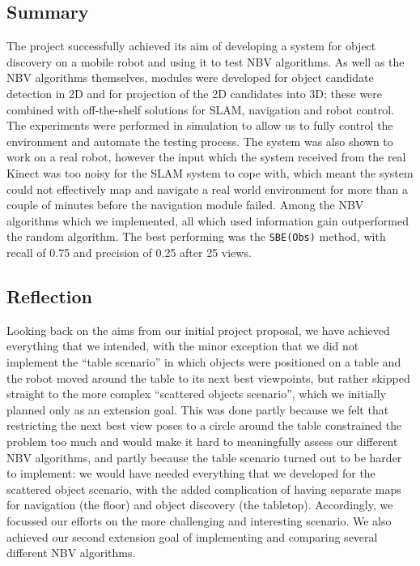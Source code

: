 

\subsection{Summary}

The project successfully achieved its aim of developing a system for object discovery on a mobile robot and using it to test NBV algorithms.
As well as the NBV algorithms themselves, modules were developed for object candidate detection in 2D and for projection of the 2D candidates into 3D; these were combined with off-the-shelf solutions for SLAM, navigation and robot control.
The experiments were performed in simulation to allow us to fully control the environment and automate the testing process.
The system was also shown to work on a real robot, however the input which the system received from the real Kinect was too noisy for the SLAM system to cope with, which meant the system could not effectively map and navigate a real world environment for more than a couple of minutes before the navigation module failed.
Among the NBV algorithms which we implemented, all which used information gain outperformed the random algorithm.
The best performing was the \texttt{SBE(Obs)} method, with recall of \num{0.75} and precision of \num{0.25} after \num{25} views.

\subsection{Reflection}
\label{ssec:reflection}

Looking back on the aims from our initial project proposal, we have achieved everything that we intended, with the minor exception that we did not implement the ``table scenario'' in which objects were positioned on a table and the robot moved around the table to its next best viewpoints, but rather skipped straight to the more complex ``scattered objects scenario'', which we initially planned only as an extension goal.
This was done partly because we felt that restricting the next best view poses to a circle around the table constrained the problem too much and would make it hard to meaningfully assess our different NBV algorithms, and partly because the table scenario turned out to be harder to implement: we would have needed everything that we developed for the scattered object scenario, with the added complication of having separate maps for navigation (the floor) and object discovery (the tabletop).
Accordingly, we focussed our efforts on the more challenging and interesting scenario.
We also achieved our second extension goal of implementing and comparing several different NBV algorithms.

